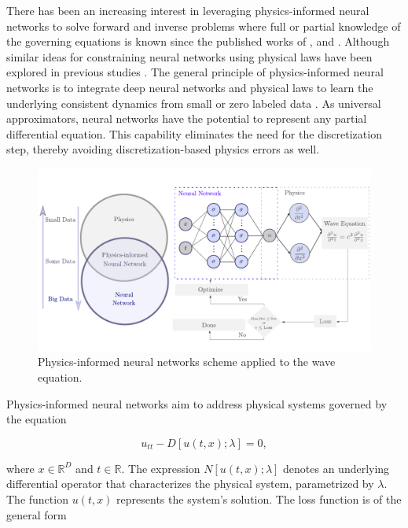 \documentclass[11pt,twoside]{article}
\begin{document}
There has been an increasing interest in leveraging physics-informed neural networks to solve forward and 
inverse problems where full or partial knowledge of the governing equations is known since the published 
works of ,  and 
. Although similar ideas for constraining neural networks using physical 
laws have been explored in previous studies \citep{lagaris_artificial_1998}. The general principle of 
physics-informed neural networks is to integrate deep neural networks and physical laws to learn the 
underlying consistent dynamics from small or zero labeled data \citep{karniadakis_physics-informed_2021}. 
As universal approximators, neural networks have the potential to represent any partial differential 
equation. This capability eliminates the need for the discretization step, thereby avoiding 
discretization-based physics errors as well. 

\begin{figure}[h]
\centering
    \includegraphics[width=1.0\textwidth]{figs/scheme_pinns_waves.pdf}
    \caption{Physics-informed neural networks scheme applied to the wave equation.}
    \label{deep_learning_subset_architecture}
\end{figure}

Physics-informed neural networks aim to address physical systems governed by the equation

$$
u_{tt} - D[u(t, x); \lambda] = 0,
$$

where \(x \in \mathbb{R}^D\) and \(t \in \mathbb{R}\). The expression \(N[u(t, x); \lambda]\) denotes 
an underlying differential operator that characterizes the physical system, parametrized by \(\lambda\). 
The function \(u(t, x)\) represents the system's solution. The loss function is of the general form 
\end{document}
